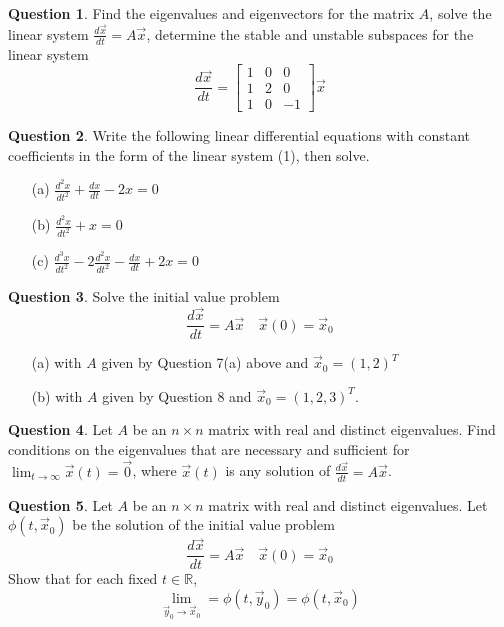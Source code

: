 \documentclass[11pt]{amsart}
\theoremstyle{definition}\newtheorem{definition}{Definition}
\theoremstyle{definition}\newtheorem{notation}{Notation}
\theoremstyle{definition}\newtheorem{example}{Example}
\theoremstyle{definition}\newtheorem{question}{Question}
\theoremstyle{theorem}\newtheorem{theorem}{Theorem}
\theoremstyle{theorem}\newtheorem{corollary}{Corollary}
\theoremstyle{theorem}\newtheorem{proposition}{Proposition}
\theoremstyle{theorem}\newtheorem{lemma}{Lemma}
\theoremstyle{remark}\newtheorem{remark}{Remark}
\newcommand{\R}{\mathbb{R}}
\begin{document}
\begin{question}
    Find the eigenvalues and eigenvectors for the matrix $A$, solve the linear system $\frac{d\vec{x}}{dt} = A\vec{x}$, determine the stable and unstable subspaces for the linear system
    \begin{equation*}
        \frac{d\vec{x}}{dt} = \begin{bmatrix} 1 & 0 & 0 \\ 1 & 2 & 0 \\ 1 & 0 & -1 \end{bmatrix}\vec{x}
    \end{equation*}
\end{question}

\begin{question}
    Write the following linear differential equations with constant coefficients in the form of the linear system (1), then solve.
    \begin{itemize}
        \item[(a)] $\frac{d^2x}{dt^2} + \frac{dx}{dt} - 2x = 0$
        \item[(b)] $\frac{d^2x}{dt^2} + x = 0$
        \item[(c)] $\frac{d^3x}{dt^2} - 2\frac{d^2x}{dt^2} - \frac{dx}{dt} + 2x = 0$
    \end{itemize}
\end{question}

\begin{question}
    Solve the initial value problem
    \begin{equation*}
        \frac{d\vec{x}}{dt} = A\vec{x} \quad \vec{x}(0) = \vec{x}_0
    \end{equation*}
    \begin{itemize}
        \item[(a)] with $A$ given by Question 7(a) above and $\vec{x}_0 = (1, 2)^T$
        \item[(b)] with $A$ given by Question 8 and $\vec{x}_0 = (1, 2, 3)^T$.
    \end{itemize}
\end{question}

\begin{question}
    Let $A$ be an $n \times n$ matrix with real and distinct eigenvalues. Find conditions on the eigenvalues that are necessary and sufficient for $\lim_{t \to \infty} \vec{x}(t) = \vec{0}$, where $\vec{x}(t)$ is any solution of $\frac{d\vec{x}}{dt} = A\vec{x}$.
\end{question}

\begin{question}
    Let $A$ be an $n \times n$ matrix with real and distinct eigenvalues. Let $\phi(t, \vec{x}_0)$ be the solution of the initial value problem
    \begin{equation*}
        \frac{d\vec{x}}{dt} = A\vec{x} \quad \vec{x}(0) = \vec{x}_0
    \end{equation*}
    Show that for each fixed $t \in \R$,
    \begin{equation*}
        \lim_{\vec{y}_0 \to \vec{x}_0} = \phi(t, \vec{y}_0) = \phi(t, \vec{x}_0)
    \end{equation*}
\end{question}
\end{document}
